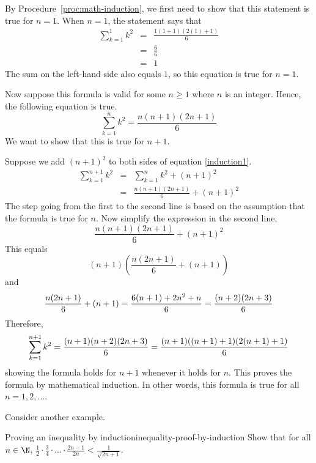 \begin{solution}
By Procedure~\ref{proc:math-induction}, we first need to show that this statement is true for $n=1$.
When $n=1$, the statement says that
\begin{eqnarray*}
\sum_{k=1}^{1}k^{2}&=&\frac{1(1+1) (2(1)+1) }{6}\\
&=&\frac{6}{6} \\
&=& 1
\end{eqnarray*}
The sum on the left-hand side also equals $1$, so this equation is true for $n=1$.

Now suppose this formula is valid for some $n\geq
1$ where $n$ is an integer. Hence, the following equation is true.
\begin{equation}
\sum_{k=1}^{n}k^{2}=
\frac{n(n+1) (2n+1) }{6}
\label{induction1}
\end{equation}
We want to show that this is true for $n+1$.

Suppose we add $(n+1)^2$ to both sides of equation {\eqref{induction1}}.
\begin{eqnarray*}
\sum_{k=1}^{n+1}k^{2}&=&\sum_{k=1}^{n}k^{2}+(n+1) ^{2} \\
&=&\frac{n(n+1) (2n+1) }{6}+(n+1) ^{2}
\end{eqnarray*}
The step going from the first to the second line is based on the assumption
that the formula is true for $n$.
Now simplify the expression in the second line,
\begin{equation*}
\frac{n(n+1) (2n+1) }{6}+(n+1) ^{2}
\end{equation*}
This equals
\begin{equation*}
(n+1) (\frac{n(2n+1) }{6}+(n+1)
)
\end{equation*}
and
\begin{equation*}
\frac{n(2n+1) }{6}+(n+1) =\frac{6(n+1)
+2n^{2}+n}{6}=\frac{\allowbreak (n+2) (2n+3) }{6}
\end{equation*}
Therefore,
\begin{equation*}
\sum_{k=1}^{n+1}k^{2}=\frac{\allowbreak (n+1) (n+2)
(2n+3) }{6}=\frac{\allowbreak (n+1) ((
n+1) +1) (2(n+1) +1) }{6}
\end{equation*}
showing the formula holds for $n+1$ whenever it holds for $n$. This proves
the formula by mathematical induction. In other words, this formula is true for all $n = 1, 2, \ldots$.
\end{solution}

Consider another example.

\begin{example}{Proving an inequality by induction}{inequality-proof-by-induction}
Show that for all $n\in \N$, $\displaystyle \frac{1}{2}\cdot
\displaystyle \frac{3}{4}\cdot\ldots\cdot\displaystyle \frac{2n-1}{2n}<\displaystyle
\frac{1}{\sqrt{2n+1}}$.
\end{example}


